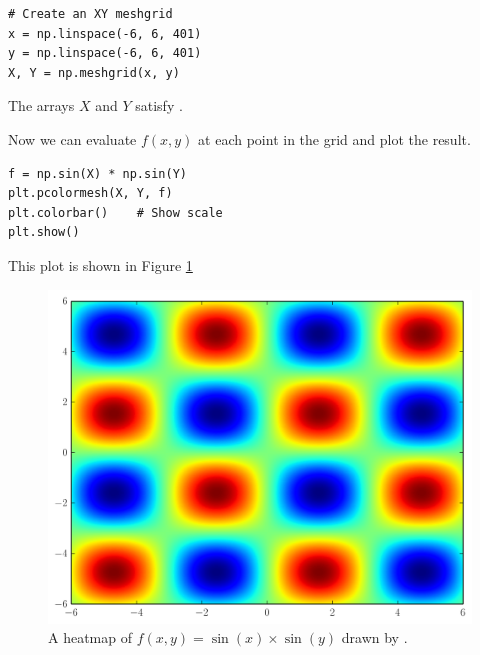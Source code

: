\begin{lstlisting}
# Create an XY meshgrid
x = np.linspace(-6, 6, 401)
y = np.linspace(-6, 6, 401)
X, Y = np.meshgrid(x, y)
\end{lstlisting}
The arrays $X$ and $Y$ satisfy .

Now we can evaluate $f(x,y)$ at each point in the grid and plot the result.
\begin{lstlisting}
f = np.sin(X) * np.sin(Y)
plt.pcolormesh(X, Y, f)
plt.colorbar()    # Show scale
plt.show()
\end{lstlisting}
This plot is shown in Figure \ref{fig:pcmexample}
\begin{figure}
\includegraphics[width=.7\textwidth]{sinxsiny.png}
\caption{A heatmap of $f(x,y)=\sin\left(x\right)\times\sin\left(y\right)$ drawn by .}
\label{fig:pcmexample}
\end{figure}

